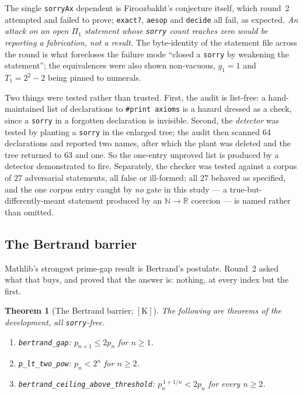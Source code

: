 \documentclass[11pt,a4paper]{article}
\theoremstyle{plain}
\newtheorem{theorem}{Theorem}[section]
\theoremstyle{definition}
\theoremstyle{remark}
\newcommand{\cK}{{[\mathrm{K}]}}
\newcommand{\N}{\mathbb{N}}
\newcommand{\R}{\mathbb{R}}
\begin{document}
The single \texttt{sorryAx} dependent is Firoozbakht's conjecture itself, which round~2
attempted and failed to prove; \texttt{exact?}, \texttt{aesop} and \texttt{decide} all fail, as
expected. \emph{An attack on an open $\Pi_1$ statement whose \texttt{sorry} count reaches
zero would be reporting a fabrication, not a result.} The byte-identity of the statement file
across the round is what forecloses the failure mode ``closed a \texttt{sorry} by weakening the
statement''; the equivalences were also shown non-vacuous, $g_1 = 1$ and $T_1 = 2^2 - 2$ being
pinned to numerals.

Two things were tested rather than trusted. First, the audit is list-free: a hand-maintained
list of declarations to \texttt{\#print axioms} is a hazard dressed as a check, since a
\texttt{sorry} in a forgotten declaration is invisible. Second, the \emph{detector} was tested
by planting a \texttt{sorry} in the enlarged tree; the audit then scanned 64 declarations and
reported two names, after which the plant was deleted and the tree returned to 63 and one. So
the one-entry unproved list is produced by a detector demonstrated to fire. Separately, the
checker was tested against a corpus of $27$ adversarial statements, all false or ill-formed;
all $27$ behaved as specified, and the one corpus entry caught by \emph{no} gate in this study
--- a true-but-differently-meant statement produced by an $\N \to \R$ coercion --- is named
rather than omitted.

\subsection{The Bertrand barrier}

Mathlib's strongest prime-gap result is Bertrand's postulate. Round~2 asked what that buys,
and proved that the answer is: nothing, at every index but the first.

\begin{theorem}[The Bertrand barrier; $\cK$]
\label{thm:barrier}
The following are theorems of the development, all \texttt{sorry}-free.
\begin{enumerate}
\item[\textup{(a)}] \texttt{bertrand\_gap}: $p_{n+1} \le 2 p_n$ for $n \ge 1$.
\item[\textup{(b)}] \texttt{p\_lt\_two\_pow}: $p_n < 2^n$ for $n \ge 2$.
\item[\textup{(c)}] \texttt{bertrand\_ceiling\_above\_threshold}:
  $p_n^{\,1 + 1/n} < 2 p_n$ for every $n \ge 2$.
\end{enumerate}
\end{theorem}
\end{document}
